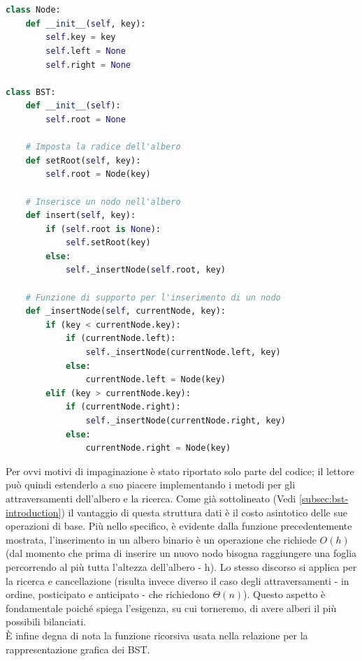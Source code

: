 \documentclass{article}
\begin{document}
\begin{lstlisting}[language=Python, caption={Implementazione di un BST}, label=yourlabel]


class Node:
    def __init__(self, key):
        self.key = key
        self.left = None
        self.right = None

class BST:
    def __init__(self):
        self.root = None

    # Imposta la radice dell'albero
    def setRoot(self, key):
        self.root = Node(key)

    # Inserisce un nodo nell'albero
    def insert(self, key):
        if (self.root is None):
            self.setRoot(key)
        else:
            self._insertNode(self.root, key)

    # Funzione di supporto per l'inserimento di un nodo
    def _insertNode(self, currentNode, key):
        if (key < currentNode.key):
            if (currentNode.left):
                self._insertNode(currentNode.left, key)
            else:
                currentNode.left = Node(key)
        elif (key > currentNode.key):
            if (currentNode.right):
                self._insertNode(currentNode.right, key)
            else:
                currentNode.right = Node(key)
\end{lstlisting}

\vspace{5pt}

Per ovvi motivi di impaginazione è stato riportato solo parte del codice; il lettore può quindi estenderlo a suo piacere implementando i metodi per gli attraversamenti dell'albero e la ricerca.
Come già sottolineato (Vedi \ref{subsec:bst-introduction}) il vantaggio di questa struttura dati è il costo asintotico delle sue operazioni di base. Più nello specifico, è evidente dalla funzione precedentemente mostrata, l'inserimento in un albero binario è un operazione che richiede $O(h)$ (dal momento che prima di inserire un nuovo nodo bisogna raggiungere una foglia percorrendo al più tutta l'altezza dell'albero - h). Lo stesso discorso si applica per la ricerca e cancellazione (risulta invece diverso il caso degli attraversamenti - in ordine, posticipato e anticipato - che richiedono $\Theta(n)$).
Questo aspetto è fondamentale poiché spiega l'esigenza, su cui torneremo, di avere alberi il più possibili bilanciati. \\
È infine degna di nota la funzione ricorsiva usata nella relazione per la rappresentazione grafica dei BST.
\end{document}
